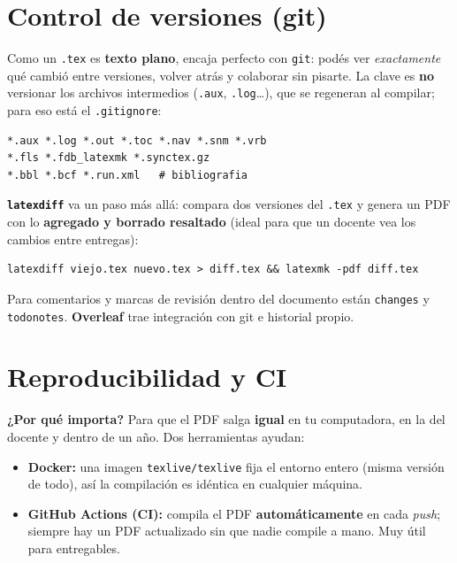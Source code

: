 \documentclass[11pt,a4paper]{article}
\begin{document}
\section{Control de versiones (git)}
Como un \texttt{.tex} es \textbf{texto plano}, encaja perfecto con \texttt{git}:
podés ver \emph{exactamente} qué cambió entre versiones, volver atrás y colaborar
sin pisarte. La clave es \textbf{no} versionar los archivos intermedios
(\texttt{.aux}, \texttt{.log}\dots), que se regeneran al compilar; para eso está
el \texttt{.gitignore}:
\begin{lstlisting}
*.aux *.log *.out *.toc *.nav *.snm *.vrb
*.fls *.fdb_latexmk *.synctex.gz
*.bbl *.bcf *.run.xml   # bibliografia
\end{lstlisting}
\textbf{\texttt{latexdiff}} va un paso más allá: compara dos versiones del
\texttt{.tex} y genera un PDF con lo \textbf{agregado y borrado resaltado} (ideal
para que un docente vea los cambios entre entregas):
\begin{lstlisting}
latexdiff viejo.tex nuevo.tex > diff.tex && latexmk -pdf diff.tex
\end{lstlisting}
Para comentarios y marcas de revisión dentro del documento están
\texttt{changes} y \texttt{todonotes}. \textbf{Overleaf} trae integración con git
e historial propio.

\section{Reproducibilidad y CI}
\textbf{¿Por qué importa?} Para que el PDF salga \textbf{igual} en tu computadora,
en la del docente y dentro de un año. Dos herramientas ayudan:
\begin{itemize}[noitemsep]
  \item \textbf{Docker:} una imagen \texttt{texlive/texlive} fija el entorno
        entero (misma versión de todo), así la compilación es idéntica en
        cualquier máquina.
  \item \textbf{GitHub Actions (CI):} compila el PDF \textbf{automáticamente} en
        cada \emph{push}; siempre hay un PDF actualizado sin que nadie compile a
        mano. Muy útil para entregables.
\end{itemize}

\end{document}
